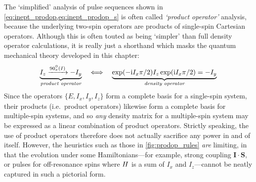 The `simplified' analysis of pulse sequences shown in \cref{eq:inept_prodop,eq:inept_prodop_s} is often called \textit{`product operator'} analysis\autocite{Sorensen1984PNMRS}, because the underlying two-spin operators are products of single-spin Cartesian operators.
Although this is often touted as being `simpler' than full density operator calculations, it is really just a shorthand which masks the quantum mechanical theory developed in this chapter:
\begin{equation}
    \label{eq:product_operator_shorthand}
    \underbrace{I_z \xrightarrow{\angang{90}{x}(I)} -I_y}_{\textit{product operator}}
    \quad\Longleftrightarrow\quad
    \underbrace{\exp(-\mi I_x\pi/2)I_z\exp(\mi I_x\pi/2) = -I_y}_{\textit{density operator}}
\end{equation}
Since the operators $\{E, I_x, I_y, I_z\}$ form a complete basis for a single-spin system, their products (i.e.\ product operators) likewise form a complete basis for multiple-spin systems, and so \textit{any} density matrix for a multiple-spin system may be expressed as a linear combination of product operators.
Strictly speaking, the use of product operators therefore does not actually sacrifice any power in and of itself.
However, the heuristics such as those in \cref{fig:prodop_rules} \textit{are} limiting, in that the evolution under some Hamiltonians---for example, strong coupling $\symbf{I}\cdot\symbf{S}$, or pulses for off-resonance spins where $H\/$ is a sum of $I_x$ and $I_z$---cannot be neatly captured in such a pictorial form.
